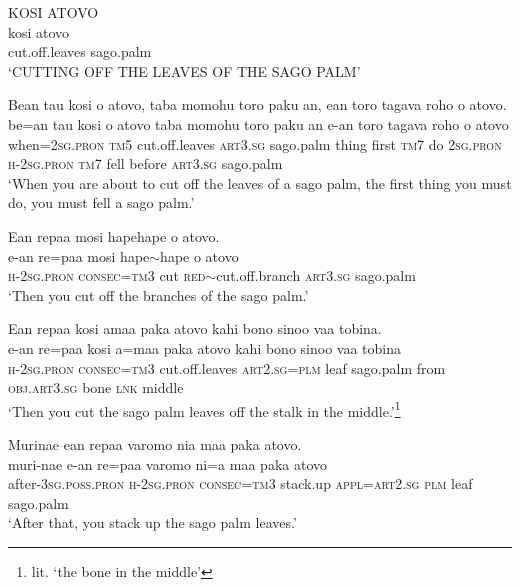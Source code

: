 \ea\label{ex:text2-6}
KOSI ATOVO\\
\gll kosi	atovo\\
     cut.off.leaves	sago.palm\\
\glt `CUTTING OFF THE LEAVES OF THE SAGO PALM'
\z

\ea\label{ex:text2-7}
Bean tau kosi o atovo, taba momohu toro paku an, ean toro tagava roho o atovo.\\
\gll be=an	tau	kosi	o	atovo	taba	momohu	toro	paku	an	e-an	toro	tagava	roho	o	atovo\\
     when=2\textsc{sg}.\textsc{pron}	\textsc{tm}5	cut.off.leaves	\textsc{art}3.\textsc{sg}	sago.palm	thing	first	\textsc{tm}7	do	2\textsc{sg}.\textsc{pron}	\textsc{h}-2\textsc{sg}.\textsc{pron}	\textsc{tm}7	fell	before	\textsc{art}3.\textsc{sg}	sago.palm\\
\glt `When you are about to cut off the leaves of a sago palm, the first thing you must do, you must fell a sago palm.'
\z

\ea\label{ex:text2-8}
Ean repaa mosi hapehape o atovo.\\
\gll e-an	re=paa	mosi	hape{$\sim$}hape	o	atovo\\
     \textsc{h}-2\textsc{sg}.\textsc{pron}	\textsc{consec}=\textsc{tm}3	cut	\textsc{red}{$\sim$}cut.off.branch	\textsc{art}3.\textsc{sg}	sago.palm\\
\glt `Then you cut off the branches of the sago palm.'
\z

\ea\label{ex:text2-9}
Ean repaa kosi amaa paka atovo kahi bono sinoo vaa tobina.\\
\gll e-an	re=paa	kosi	a=maa	paka	atovo	kahi	bono	sinoo	vaa	tobina\\
     \textsc{h}-2\textsc{sg}.\textsc{pron}	\textsc{consec}=\textsc{tm}3	cut.off.leaves	\textsc{art}2.\textsc{sg}=\textsc{plm}	leaf	sago.palm	from	\textsc{obj}.\textsc{art}3.\textsc{sg}	bone	\textsc{lnk}	middle\\
\glt `Then you cut the sago palm leaves off the stalk in the middle.'\footnote{lit. `the bone in the middle'}
\z

\ea\label{ex:text2-10}
Murinae ean repaa varomo nia maa paka atovo.\\
\gll muri-nae	e-an	re=paa	varomo	ni=a	maa	paka	atovo\\
     after-3\textsc{sg}.\textsc{poss}.\textsc{pron}	\textsc{h}-2\textsc{sg}.\textsc{pron}	\textsc{consec}=\textsc{tm}3	stack.up	\textsc{appl}=\textsc{art}2.\textsc{sg}	\textsc{plm}	leaf	sago.palm\\
\glt `After that, you stack up the sago palm leaves.'
\z

